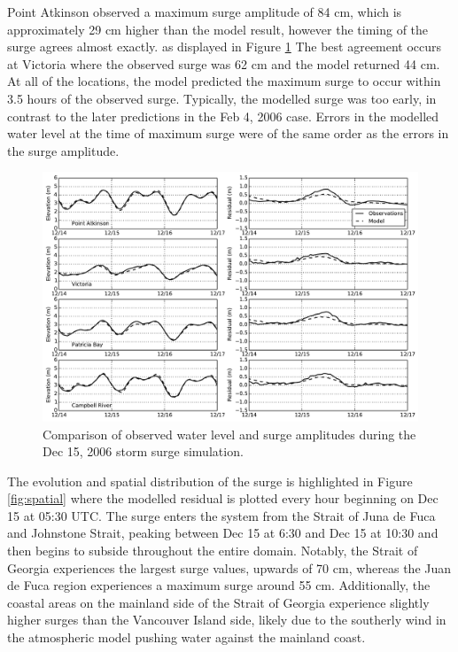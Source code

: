 \documentclass[pdftex,10pt]{article}
\begin{document}
Point Atkinson observed a maximum surge amplitude of 84 cm, which is approximately 29 cm higher than the model result, however the timing of the surge agrees almost exactly. as displayed in Figure \ref{fig:dec2006} The best agreement occurs at Victoria where the observed surge was 62 cm and the model returned 44 cm. At all of the locations, the model predicted the maximum surge to occur within 3.5 hours of the observed surge. Typically, the modelled surge was too early, in contrast to the later predictions in the Feb 4, 2006 case. Errors in the modelled water level at the time of maximum surge were of the same order as the errors in the surge amplitude.  

\begin{figure}
\centering
\includegraphics[scale=0.6]{Figures/dec2006.pdf}
\caption{Comparison of observed water level and surge amplitudes during the Dec 15, 2006 storm surge simulation. }
\label{fig:dec2006}
\end{figure}%

The evolution and spatial distribution of the surge is highlighted in Figure \ref{fig:spatial} where the modelled residual is plotted every hour beginning on Dec 15 at 05:30 UTC. The surge enters the system from the Strait of Juna de Fuca and Johnstone Strait, peaking between Dec 15 at 6:30 and Dec 15 at 10:30 and then begins to subside throughout the entire domain. Notably, the Strait of Georgia experiences the largest surge values, upwards of 70 cm, whereas the Juan de Fuca region experiences a maximum surge around 55 cm. Additionally, the coastal areas on the mainland side of the Strait of Georgia experience slightly higher surges than the Vancouver Island side, likely due to the southerly wind in the atmospheric model pushing water against the mainland coast.  
\end{document}
